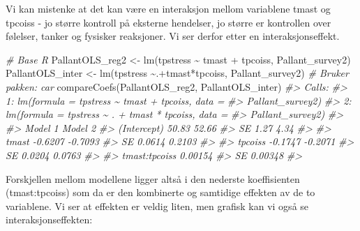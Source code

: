\documentclass[
]{article}
\newenvironment{Shaded}{\begin{snugshade}}{\end{snugshade}}
\newcommand{\CommentTok}[1]{\textcolor[rgb]{0.56,0.35,0.01}{\textit{#1}}}
\newcommand{\FunctionTok}[1]{\textcolor[rgb]{0.00,0.00,0.00}{#1}}
\newcommand{\NormalTok}[1]{#1}
\newcommand{\OtherTok}[1]{\textcolor[rgb]{0.56,0.35,0.01}{#1}}
\newcommand{\SpecialCharTok}[1]{\textcolor[rgb]{0.00,0.00,0.00}{#1}}
\begin{document}
Vi kan mistenke at det kan være en interaksjon mellom variablene tmast og tpcoiss - jo større kontroll på eksterne hendelser, jo større er kontrollen over følelser, tanker og fysisker reaksjoner. Vi ser derfor etter en interaksjonseffekt.

\begin{Shaded}
\begin{Highlighting}[]
\CommentTok{\# Base R}
\NormalTok{PallantOLS\_reg2 }\OtherTok{\textless{}{-}} \FunctionTok{lm}\NormalTok{(tpstress }\SpecialCharTok{\textasciitilde{}}\NormalTok{ tmast }\SpecialCharTok{+}\NormalTok{ tpcoiss, Pallant\_survey2)}
\NormalTok{PallantOLS\_inter }\OtherTok{\textless{}{-}} \FunctionTok{lm}\NormalTok{(tpstress }\SpecialCharTok{\textasciitilde{}}\NormalTok{.}\SpecialCharTok{+}\NormalTok{tmast}\SpecialCharTok{*}\NormalTok{tpcoiss, Pallant\_survey2)}
\CommentTok{\# Bruker pakken: car}
\FunctionTok{compareCoefs}\NormalTok{(PallantOLS\_reg2, PallantOLS\_inter)}
\CommentTok{\#\textgreater{} Calls:}
\CommentTok{\#\textgreater{} 1: lm(formula = tpstress \textasciitilde{} tmast + tpcoiss, data = }
\CommentTok{\#\textgreater{}   Pallant\_survey2)}
\CommentTok{\#\textgreater{} 2: lm(formula = tpstress \textasciitilde{} . + tmast * tpcoiss, data = }
\CommentTok{\#\textgreater{}   Pallant\_survey2)}
\CommentTok{\#\textgreater{} }
\CommentTok{\#\textgreater{}               Model 1 Model 2}
\CommentTok{\#\textgreater{} (Intercept)     50.83   52.66}
\CommentTok{\#\textgreater{} SE               1.27    4.34}
\CommentTok{\#\textgreater{}                              }
\CommentTok{\#\textgreater{} tmast         {-}0.6207 {-}0.7093}
\CommentTok{\#\textgreater{} SE             0.0614  0.2103}
\CommentTok{\#\textgreater{}                              }
\CommentTok{\#\textgreater{} tpcoiss       {-}0.1747 {-}0.2071}
\CommentTok{\#\textgreater{} SE             0.0204  0.0763}
\CommentTok{\#\textgreater{}                              }
\CommentTok{\#\textgreater{} tmast:tpcoiss         0.00154}
\CommentTok{\#\textgreater{} SE                    0.00348}
\CommentTok{\#\textgreater{} }
\end{Highlighting}
\end{Shaded}

Forskjellen mellom modellene ligger altså i den nederste koeffisienten (tmast:tpcoiss) som da er den kombinerte og samtidige effekten av de to variablene. Vi ser at effekten er veldig liten, men grafisk kan vi også se interaksjonseffekten:
\end{document}
